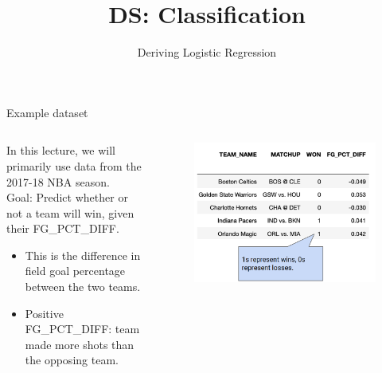 \documentclass[aspectratio=169]{../latex_main/tntbeamer}  %
\title[LR: Derivation]{DS: Classification}
\subtitle{Deriving Logistic Regression}
\begin{document}
	
	\maketitle
	\begin{frame}{Example dataset}
	    \begin{columns}
	        \begin{column}{.4\textwidth}
	                In this lecture, we will primarily use data from the 2017-18 NBA season.\\  \bigskip
	                Goal: Predict whether or not a team will win, given their FG\_PCT\_DIFF.
	                \begin{itemize}
	                    \item This is the difference in field goal percentage between the two teams.
	                    \item Positive FG\_PCT\_DIFF: team made more shots than the opposing team.
	                \end{itemize}
	        \end{column}
	        
	        \begin{column}{.4\textwidth}
	                \begin{figure}
	                    \includegraphics[scale=.35]{Bild3}
	                \end{figure}
	        \end{column}
	    \end{columns}
	\end{frame}
	
\end{document}
